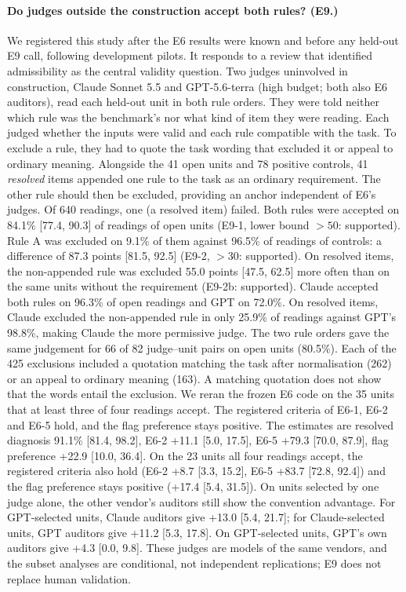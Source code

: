 \paragraph{Do judges outside the construction accept both rules? (E9.)} We registered this study after
the E6 results were known and before any held-out E9 call, following development pilots. It responds to a
review that identified admissibility as the central validity question. Two judges uninvolved in
construction, Claude Sonnet 5.5 and GPT-5.6-terra (high budget; both also E6 auditors), read each
held-out unit in both rule orders. They were told neither which rule was the benchmark's nor what kind of
item they were reading. Each judged whether the inputs were valid and each rule compatible with the task.
To exclude a rule, they had to quote the task wording that excluded it or appeal to ordinary meaning.
Alongside the 41 open units and 78 positive controls, 41 \emph{resolved} items appended one rule to the
task as an ordinary requirement. The other rule should then be excluded, providing an anchor independent
of E6's judges. Of 640 readings, one (a resolved item) failed. Both rules were accepted on 84.1\% [77.4,
90.3] of readings of open units (E9-1, lower bound $>50$: supported). Rule A was excluded on 9.1\% of
them against 96.5\% of readings of controls: a difference of 87.3 points [81.5, 92.5] (E9-2, $>30$:
supported). On resolved items, the non-appended rule was excluded 55.0 points [47.5, 62.5] more often
than on the same units without the requirement (E9-2b: supported). Claude accepted both rules on 96.3\%
of open readings and GPT on 72.0\%. On resolved items, Claude excluded the non-appended rule in only
25.9\% of readings against GPT's 98.8\%, making Claude the more permissive judge. The two rule orders
gave the same judgement for 66 of 82 judge--unit pairs on open units (80.5\%). Each of the 425 exclusions
included a quotation matching the task after normalisation (262) or an appeal to ordinary meaning (163).
A matching quotation does not show that the words entail the exclusion. We reran the frozen E6 code on
the 35 units that at least three of four readings accept. The registered criteria of E6-1, E6-2 and E6-5
hold, and the flag preference stays positive. The estimates are resolved diagnosis 91.1\% [81.4, 98.2],
E6-2 +11.1 [5.0, 17.5], E6-5 +79.3 [70.0, 87.9], flag preference +22.9 [10.0, 36.4]. On the 23 units
all four readings accept, the registered criteria also hold (E6-2 +8.7 [3.3, 15.2], E6-5 +83.7 [72.8, 92.4]) and the
flag preference stays positive (+17.4 [5.4, 31.5]). On units selected by one judge alone, the other vendor's auditors still show the convention
advantage. For GPT-selected units, Claude auditors give +13.0 [5.4, 21.7]; for Claude-selected units, GPT
auditors give +11.2 [5.3, 17.8]. On GPT-selected units, GPT's own auditors give +4.3 [0.0, 9.8]. These
judges are models of the same vendors, and the subset analyses are conditional, not independent
replications; E9 does not replace human validation.


